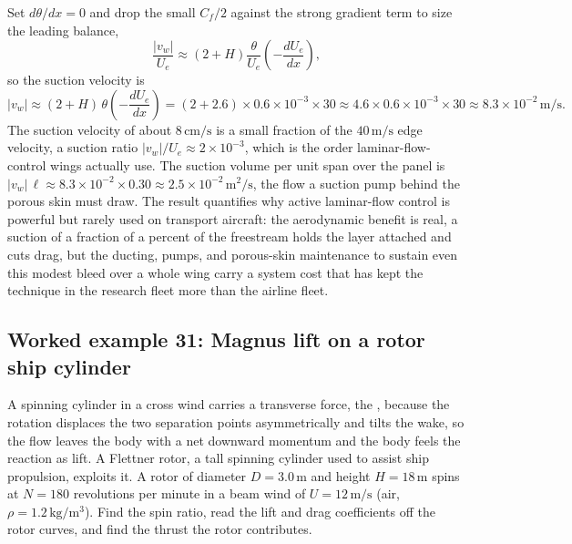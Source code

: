 Set $d\theta/dx = 0$ and drop the small $C_f/2$ against the strong
gradient term to size the leading balance,
\[
\frac{|v_w|}{U_e} \approx (2 + H)\frac{\theta}{U_e}\left(-\frac{dU_e}{
dx}\right),
\]
so the suction velocity is
\[
|v_w| \approx (2 + H)\,\theta\left(-\frac{dU_e}{dx}\right) = (2 + 2.6)
\times0.6\times10^{-3}\times30 \approx 4.6\times0.6\times10^{-3}\times
30 \approx 8.3\times10^{-2}\,\si{\meter\per\second}.
\]
The suction velocity of about $8\,\si{\centi\meter\per\second}$ is a
small fraction of the $40\,\si{\meter\per\second}$ edge velocity, a
suction ratio $|v_w|/U_e \approx 2\times10^{-3}$, which is the order
laminar-flow-control wings actually use. The suction volume per unit
span over the panel is $|v_w|\,\ell \approx 8.3\times10^{-2}\times0.30
\approx 2.5\times10^{-2}\,\si{\meter\squared\per\second}$, the flow a
suction pump behind the porous skin must draw. The result quantifies
why active laminar-flow control is powerful but rarely used on
transport aircraft: the aerodynamic benefit is real, a suction of a
fraction of a percent of the freestream holds the layer attached and
cuts drag, but the ducting, pumps, and porous-skin maintenance to
sustain even this modest bleed over a whole wing carry a system cost
that has kept the technique in the research fleet more than the
airline fleet.

\subsection*{Worked example 31: Magnus lift on a rotor ship cylinder}

A spinning cylinder in a cross wind carries a transverse force, the
, because the rotation displaces the two
separation points asymmetrically and tilts the wake, so the flow leaves
the body with a net downward momentum and the body feels the reaction as
lift. A Flettner rotor, a tall spinning cylinder used to assist ship
propulsion, exploits it. A rotor of diameter $D = 3.0\,\si{\meter}$ and
height $H = 18\,\si{\meter}$ spins at $N = 180$ revolutions per minute in
a beam wind of $U = 12\,\si{\meter\per\second}$ (air, $\rho = 1.2\,\si{
\kilogram\per\meter\cubed}$). Find the spin ratio, read the lift and drag
coefficients off the rotor curves, and find the thrust the rotor
contributes.

